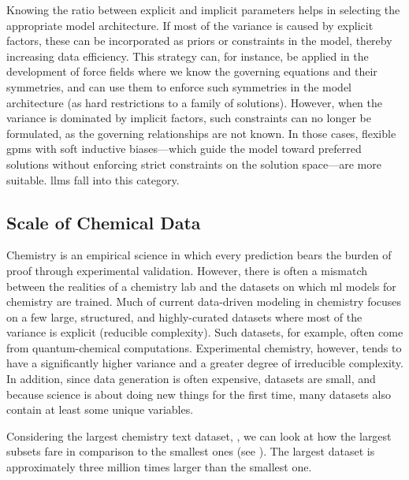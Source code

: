 Knowing the ratio between explicit and implicit parameters helps in selecting the appropriate model architecture. 
If most of the variance is caused by explicit factors, these can be incorporated as priors or constraints in the model, thereby increasing data efficiency. 
This strategy can, for instance, be applied in the development of force fields where we know the governing equations and their symmetries, and can use them to enforce such symmetries in the model architecture (as hard restrictions to a family of solutions). \autocite{unke2021machine,Musil_2021}
However, when the variance is dominated by implicit factors, such constraints can no longer be formulated, as the governing relationships are not known. 
In those cases, flexible \glspl{gpm} with soft inductive biases---which guide the model toward preferred solutions without enforcing strict constraints on the solution space\autocite{wilson2025deep}---are more suitable. \glspl{llm} fall into this category.


\subsection{Scale of Chemical Data}
Chemistry is an empirical science in which every prediction bears the burden of proof through experimental validation.\autocite{zunger2019beware} 
However, there is often a mismatch between the realities of a chemistry lab and the datasets on which \gls{ml} models for chemistry are trained. 
Much of current data-driven modeling in chemistry focuses on a few large, structured, and highly-curated datasets where most of the variance is explicit (reducible complexity). 
Such datasets,  for example,\autocite{ramakrishnan2014quantum} often come from quantum-chemical computations.
Experimental chemistry, however, tends to have a significantly higher variance and a greater degree of irreducible complexity. 
In addition, since data generation is often expensive, datasets are small, and because science is about doing new things for the first time, many datasets also contain at least some unique variables.

Considering the largest chemistry text dataset, ,\autocite{mirza2025chempile0} we can look at how the largest subsets fare in comparison to the smallest ones (see ). 
The largest dataset is approximately three million times larger than the smallest one.

